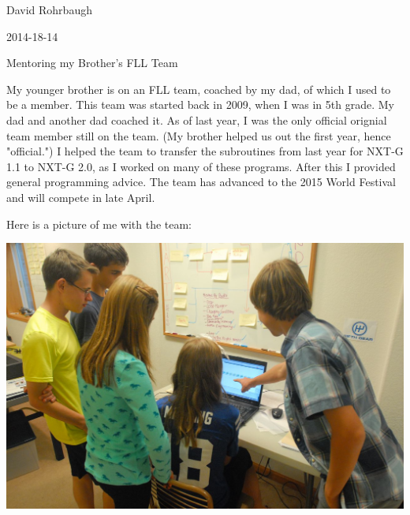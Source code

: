 David Rohrbaugh

2014-18-14

Mentoring my Brother's FLL Team

\medskip

My younger brother is on an FLL team, coached by my dad, of which I used to be a member. This team was started back in 2009, when I was in 5th grade. My dad and another dad coached it. As of last year, I was the only official orignial team member still on the team. (My brother helped us out the first year, hence "official.") I helped the team to transfer the subroutines from last year for NXT-G 1.1 to NXT-G 2.0, as I worked on many of these programs. After this I provided general programming advice. The team has advanced to the 2015 World Festival and will compete in late April.

\medskip

Here is a picture of me with the team:

\begin{center}
 \includegraphics[width=\textwidth]{./Entries/Images/mentoring.jpg}
\end{center}
